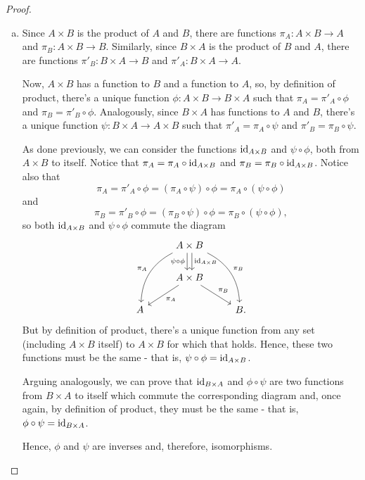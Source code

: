 \begin{proof}
	\begin{enumerate}[(a)]
		\item Since $A\times B$ is the product of $A$ and $B$, there are functions $\pi_A:A\times B\to A$ and $\pi_B:A\times B\to B$. Similarly, since $B\times A$ is the product of $B$ and $A$, there are functions $\pi'_B:B\times A\to B$ and $\pi'_A:B\times A\to A$.
		
		Now, $A\times B$ has a function to $B$ and a function to $A$, so, by definition of product, there's a unique function $\phi:A\times B\to B\times A$ such that $\pi_A=\pi'_A\circ\phi$ and $\pi_B=\pi'_B\circ\phi$. Analogously, since $B\times A$ has functions to $A$ and $B$, there's a unique function $\psi:B\times A\to A\times B$ such that $\pi'_A=\pi_A\circ\psi$ and $\pi'_B=\pi_B\circ \psi$.
		
		As done previously, we can consider the functions ${\rm id}_{A\times B}$ and $\psi\circ\phi$, both from $A\times B$ to itself. Notice that $\pi_A=\pi_A\circ{\rm id}_{A\times B}$ and $\pi_B=\pi_B\circ{\rm id}_{A\times B}$. Notice also that $$\pi_A=\pi'_A\circ\phi=(\pi_A\circ\psi)\circ\phi=\pi_A\circ(\psi\circ\phi)$$and$$\pi_B=\pi'_B\circ\phi=(\pi_B\circ\psi)\circ\phi=\pi_B\circ(\psi\circ\phi),$$so both ${\rm id}_{A\times B}$ and $\psi\circ\phi$ commute the diagram
		\[\begin{tikzcd}
		& A\times B \arrow[d, "\id_{A\times B}",shift left] \arrow[d, "\psi\circ\phi"',shift right] \arrow[ldd, "\pi_A"', bend right] \arrow[rdd, "\pi_B", bend left] &   \\
		& A\times B \arrow[ld, "\pi_A"] \arrow[rd, "\pi_B"]                                                                                    &   \\
		A &                                                                                                                                      & B.
		\end{tikzcd}\] But by definition of product, there's a unique function from any set (including $A\times B$ itself) to $A\times B$ for which that holds. Hence, these two functions must be the same - that is, $\psi\circ\phi={\rm id}_{A\times B}$.
		
		Arguing analogously, we can prove that ${\rm id}_{B\times A}$ and $\phi\circ\psi$ are two functions from $B\times A$ to itself which commute the corresponding diagram and, once again, by definition of product, they must be the same - that is, $\phi\circ\psi={\rm id}_{B\times A}$.
		
		Hence, $\phi$ and $\psi$ are inverses and, therefore, isomorphisms.
		

\end{enumerate}
\end{proof}
